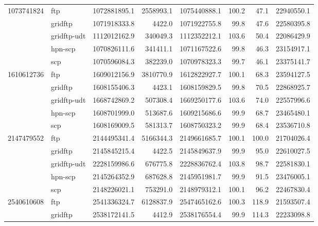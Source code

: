 \documentclass{sig-alternate-05-2015}
\begin{document}
\begin{table}[t]
\begin{tabular}{rlrrrrrr}
	\midrule
	1073741824 &          ftp & 1072881895.1 &  2558993.1 & 1075440888.1 &      100.2 &      47.1 &       22940550.1 \\
	           &      gridftp & 1071918333.8 &     4422.0 & 1071922755.8 &       99.8 &      47.6 &       22580395.8 \\
	           &  gridftp-udt & 1112012162.9 &   340049.3 & 1112352212.1 &      103.6 &      50.4 &       22086429.9 \\
	           &      hpn-scp & 1070826111.6 &   341411.1 & 1071167522.6 &       99.8 &      46.3 &       23154917.1 \\
	           &          scp & 1070596084.3 &   382239.0 & 1070978323.3 &       99.7 &      46.1 &       23375141.7 \\
	\midrule
	1610612736 &          ftp & 1609012156.9 &  3810770.9 & 1612822927.7 &      100.1 &      68.3 &       23594127.5 \\
	           &      gridftp & 1608155406.3 &     4423.1 & 1608159829.5 &       99.8 &      70.5 &       22868925.7 \\
	           &  gridftp-udt & 1668742869.2 &   507308.4 & 1669250177.6 &      103.6 &      74.0 &       22557996.6 \\
	           &      hpn-scp & 1608701999.0 &   513687.6 & 1609215686.6 &       99.9 &      68.7 &       23465480.1 \\
	           &          scp & 1608169009.5 &   581313.7 & 1608750323.2 &       99.9 &      68.4 &       23536710.8 \\
	\midrule
	2147479552 &          ftp & 2144495341.4 &  5166344.3 & 2149661685.7 &      100.1 &     100.0 &       21704026.4 \\
	           &      gridftp & 2145845215.4 &     4422.5 & 2145849637.9 &       99.9 &      95.0 &       22610027.5 \\
	           &  gridftp-udt & 2228159986.6 &   676775.8 & 2228836762.4 &      103.8 &      98.7 &       22581830.1 \\
	           &      hpn-scp & 2145264352.9 &   687628.8 & 2145951981.7 &       99.9 &      91.5 &       23476005.1 \\
	           &          scp & 2148226021.1 &   753291.0 & 2148979312.1 &      100.1 &      96.2 &       22467830.4 \\
	\midrule
	2540610608 &          ftp & 2541336324.7 &  6128837.9 & 2547465162.6 &      100.3 &     118.9 &       21593507.4 \\
	           &      gridftp & 2538172141.5 &     4412.9 & 2538176554.4 &       99.9 &     114.3 &       22233098.8 \\

\end{tabular}
\end{table}
\end{document}
